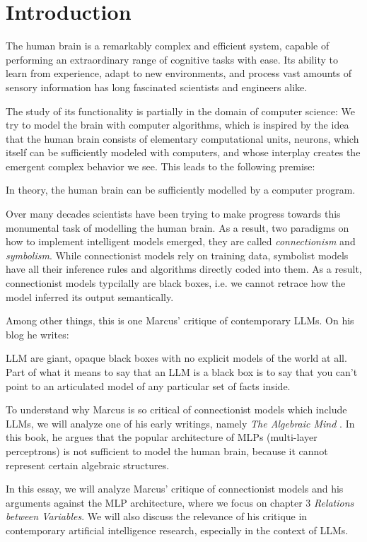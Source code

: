 \documentclass[../../main.tex]{subfiles}
\begin{document}
    \chapter{Introduction}
    The human brain is a remarkably complex and efficient system, capable of performing an extraordinary range of cognitive tasks with ease. Its ability to learn from experience, adapt to new environments, and process vast amounts of sensory information has long fascinated scientists and engineers alike.

    The study of its functionality is partially in the domain of computer science: We try to model the brain with computer algorithms, which is inspired by the idea that the human brain consists of elementary computational units, neurons, which itself can be sufficiently modeled with computers, and whose interplay creates the emergent complex behavior we see. This leads to the following premise:

    \begin{premise}
        In theory, the human brain can be sufficiently modelled by a computer program.
    \end{premise}

    Over many decades scientists have been trying to make progress towards this monumental task of modelling the human brain. As a result, two paradigms on how to implement intelligent models emerged, they are called \emph{connectionism} and \emph{symbolism}. While connectionist models rely on training data, symbolist models have all their inference rules and algorithms directly coded into them. As a result, connectionist models typcilally are black boxes, i.e. we cannot retrace how the model inferred its output semantically.

    Among other things, this is one Marcus' critique of contemporary LLMs. On his blog he writes:

    \begin{citecallout}
        LLM are giant, opaque black boxes with no explicit models of the world at all. Part of what it means to say that an LLM is a black box is to say that you can't point to an articulated model of any particular set of facts inside.
    \end{citecallout}

    To understand why Marcus is so critical of connectionist models which include LLMs, we will analyze one of his early writings, namely \emph{The Algebraic Mind} \cite{marcus_algebraic_mind}. In this book, he argues that the popular architecture of MLPs (multi-layer perceptrons) is not sufficient to model the human brain, because it cannot represent certain algebraic structures.

    In this essay, we will analyze Marcus' critique of connectionist models and his arguments against the MLP architecture, where we focus on chapter 3 \textit{Relations between Variables}. We will also discuss the relevance of his critique in contemporary artificial intelligence research, especially in the context of LLMs.
\end{document}
